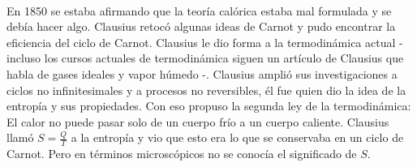 \\
En 1850 se estaba afirmando que la teoría calórica estaba mal formulada y se debía hacer algo. Clausius retocó algunas ideas de Carnot y pudo encontrar la eficiencia del ciclo de Carnot. Clausius le dio forma a la termodinámica actual -incluso los cursos actuales de termodinámica siguen un artículo de Clausius que habla de gases ideales y vapor húmedo \cite{MullerHistory}-. Clausius amplió sus investigaciones a ciclos no infinitesimales y a procesos no reversibles, él fue quien dio la idea de la entropía y sus propiedades. Con eso propuso la segunda ley de la termodinámica: El calor no puede pasar solo de un cuerpo frío a un cuerpo caliente. Clausius llamó $S=\frac{Q}{T}$ a la entropía y vio que esto era lo que se conservaba en un ciclo de Carnot. Pero en términos microscópicos no se conocía el significado de $S$.
\\
